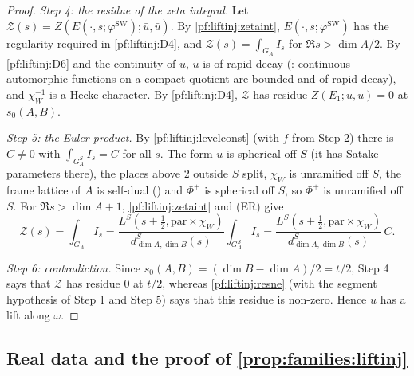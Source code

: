 \begin{proof}
\emph{Step 4: the residue of the zeta integral.} Let $\mathcal Z(s)=Z(E(\cdot,s;\varphi^{\mathrm{SW}});\bar u,\bar u)$. By \cref{pf:liftinj:zetaint},
$E(\cdot,s;\varphi^{\mathrm{SW}})$ has the regularity required in \ref{pf:liftinj:D4}, and $\mathcal Z(s)=\int_{G_A}I_s$ for $\Re s>\dim A/2$. By
\ref{pf:liftinj:D6} and the continuity of $u$, $\bar u$ is of rapid decay (:
continuous automorphic functions on a compact quotient are bounded and of rapid decay), and $\chi_W^{-1}$ is a Hecke character. By
\ref{pf:liftinj:D4}, $\mathcal Z$ has residue $Z(E_1;\bar u,\bar u)=0$ at $s_0(A,B)$.

\emph{Step 5: the Euler product.} By \cref{pf:liftinj:levelconst} (with $f$ from Step 2) there is $C\ne0$ with $\int_{G_A^S}I_s=C$ for all $s$. The form $u$ is spherical off $S$ (it has
Satake parameters there), the places above $2$ outside $S$ split, $\chi_W$ is unramified off $S$, the frame lattice of $A$ is self-dual
() and $\Phi^+$ is spherical off $S$, so $\Phi^+$ is unramified off $S$. For $\Re s>\dim A+1$,
\cref{pf:liftinj:zetaint} and (ER) give
\[
\mathcal Z(s)=\int_{G_A}I_s=\frac{L^S(s+\frac12,\mathrm{par}\times\chi_W)}{d^S_{\dim A,\dim B}(s)}\int_{G_A^S}I_s
=\frac{L^S(s+\frac12,\mathrm{par}\times\chi_W)}{d^S_{\dim A,\dim B}(s)}\,C .
\]

\emph{Step 6: contradiction.} Since $s_0(A,B)=(\dim B-\dim A)/2=t/2$, Step 4 says that $\mathcal Z$ has residue $0$ at $t/2$, whereas
\cref{pf:liftinj:resne} (with the segment hypothesis of Step 1 and Step 5) says that this residue is non-zero. Hence $u$ has a lift along $\omega$.
\end{proof}

\subsection{Real data and the proof of \cref{prop:families:liftinj}}\label{sec:pf:liftinj:realdata}

